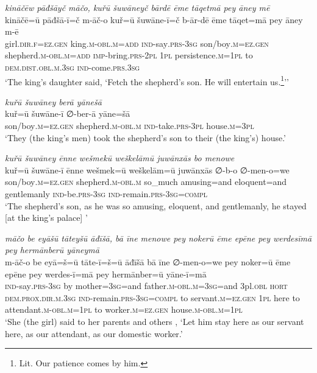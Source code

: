 \ea \label{KŠ.40}
\textit{kināčēw pāđšāyč māčo, kuřū šuwāneyč bārdē ēme tāqetmā pey āney mē} \\ 
\gll kināčē=ū pāđšā-ī=č m-āč-o kuř=ū šuwāne-ī=č b-ār-dē ēme tāqet=mā pey āney m-ē \\ 
 girl\textsc{.dir}\textsc{.f}\textsc{=ez.gen} king\textsc{.m}\textsc{-obl}\textsc{.m}\textsc{=add} \textsc{ind-}say\textsc{.prs}\textsc{-3sg} son/boy\textsc{.m}\textsc{=ez.gen} shepherd\textsc{.m}\textsc{-obl}\textsc{.m}\textsc{=add} \textsc{imp-}bring\textsc{.prs}-\textsc{2pl} \textsc{1pl} persistence\textsc{.m}\textsc{=\textsc{1pl}} to \textsc{dem.dist}\textsc{.obl}\textsc{.m}\textsc{.3sg} \textsc{ind-}come\textsc{.prs}\textsc{.3sg} \\ 
\glt `The king’s daughter said, ‘Fetch the shepherd’s son. He will entertain us.\footnote{Lit. Our patience comes by him.}’'
\z 
 
\ea \label{KŠ.41}
\textit{kuřū šuwāney berā yānešā} \\ 
\gll kuř=ū šuwāne-ī ∅-ber-ā yāne=šā \\ 
 son/boy\textsc{.m}\textsc{=ez.gen} shepherd\textsc{.m}\textsc{-obl}\textsc{.m} \textsc{ind-}take\textsc{.prs}\textsc{-3pl} house\textsc{.m}\textsc{=3pl} \\ 
\glt `They (the king’s men) took the shepherd’s son to their (the king’s) house.'
\z 
 
\ea \label{KŠ.42}
\textit{kuřū šuwāney ēnne wešmekū weškelāmū juwānxās bo menowe} \\ 
\gll kuř=ū šuwāne-ī ēnne wešmek=ū weškelām=ū juwānxās ∅-b-o ∅-men-o=we \\ 
 son/boy\textsc{.m}\textsc{=ez.gen} shepherd\textsc{.m}\textsc{-obl}\textsc{.m} so\_much amusing=and eloquent=and gentlemanly \textsc{ind-}be\textsc{.prs}\textsc{-3sg} \textsc{ind-}remain\textsc{.prs}\textsc{-3sg}\textsc{=compl} \\ 
\glt `The shepherd’s son, as he was so amusing, eloquent, and gentlemanly, he stayed [at the king’s palace] '
\z 
 
\ea \label{KŠ.43}
\textit{māčo be eyāšū tāteyšū āđīšā, bā īne menowe pey nokerū ēme epēne pey werdesīmā pey hermānberū yāneymā} \\ 
\gll m-āč-o be eyā=š=ū tāte-ī=š=ū āđīšā bā īne ∅-men-o=we pey noker=ū ēme epēne pey werdes-ī=mā pey hermānber=ū yāne-ī=mā \\ 
 \textsc{ind-}say\textsc{.prs}\textsc{-3sg} by mother\textsc{=3sg}=and father\textsc{.m}\textsc{-obl}\textsc{.m}\textsc{=3sg}=and 3pl\textsc{.obl} \textsc{hort} \textsc{dem.prox}\textsc{.dir}\textsc{.m}\textsc{.3sg} \textsc{ind-}remain\textsc{.prs}\textsc{-3sg}\textsc{=compl} to servant\textsc{.m}\textsc{=ez.gen} \textsc{1pl} here to attendant\textsc{.m}\textsc{-obl}\textsc{.m}\textsc{=\textsc{1pl}} to worker\textsc{.m}\textsc{=ez.gen} house\textsc{.m}\textsc{-obl}\textsc{.m}\textsc{=\textsc{1pl}} \\ 
\glt `She (the girl) said to her parents and others , ‘Let him stay here as our servant here, as our attendant, as our domestic worker.'
\z 
 
